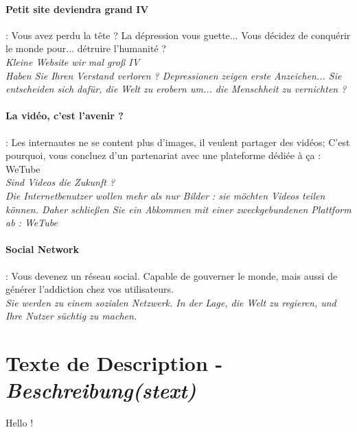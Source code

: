 \documentclass[10pt,a4paper]{article}
\begin{document}
\paragraph{Petit site deviendra grand IV} : Vous avez perdu la tête ? La dépression vous guette... Vous décidez de conquérir le monde pour... détruire l'humanité ?\\
\textit{Kleine Website wir mal groß IV}\\
\textit{Haben Sie Ihren Verstand verloren ? Depressionen zeigen erste Anzeichen... Sie entscheiden sich dafür, die Welt zu erobern um... die Menschheit zu vernichten ?}


\paragraph{La vidéo, c'est l'avenir ?} : Les internautes ne se content plus d'images, il veulent partager des vidéos; C'est pourquoi, vous concluez d'un partenariat avec une plateforme dédiée à ça : WeTube\\
\textit{Sind Videos die Zukunft ?}\\
\textit{Die Internetbenutzer wollen mehr als nur Bilder : sie möchten Videos teilen können. Daher schließen Sie ein Abkommen mit einer zweckgebundenen Plattform ab : WeTube}


\paragraph{Social Network} : Vous devenez un réseau social. Capable de gouverner le monde, mais aussi de générer l'addiction chez vos utilisateurs.\\
\textit{Sie werden zu einem sozialen Netzwerk. In der Lage, die Welt zu regieren, und Ihre Nutzer süchtig zu machen.}



\section{Texte de Description -\emph{Beschreibung(stext)}}

Hello !
\end{document}
